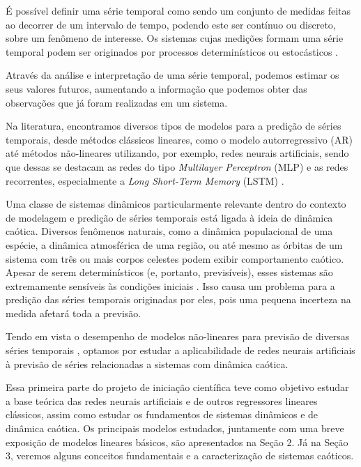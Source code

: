 \documentclass[a4paper, 12pt]{article}
\begin{document}
É possível definir uma série temporal como sendo um conjunto de medidas feitas ao decorrer de um intervalo de tempo, podendo este ser contínuo ou discreto, sobre um fenômeno de interesse. Os sistemas cujas medições formam uma série temporal podem ser originados por processos determinísticos ou estocásticos \cite{box2015time}.

Através da análise e interpretação de uma série temporal, podemos estimar os seus valores futuros, aumentando a informação que podemos obter das observações que já foram realizadas em um sistema.

Na literatura, encontramos diversos tipos de modelos para a  predição de séries temporais, desde métodos clássicos lineares, como o modelo autorregressivo (AR) \cite{box2015time} até métodos não-lineares utilizando, por exemplo, redes neurais artificiais, sendo que dessas se destacam as redes do tipo \textit{Multilayer Perceptron} (MLP) e as redes recorrentes, especialmente a \textit{Long Short-Term Memory} (LSTM)  \cite{connor1994recurrent}.

Uma classe de sistemas dinâmicos particularmente relevante dentro do contexto de modelagem e predição de séries temporais está ligada à ideia de dinâmica caótica. Diversos fenômenos naturais, como a dinâmica populacional de uma espécie, a dinâmica atmosférica de uma região, ou até mesmo as órbitas de um sistema com três ou mais corpos celestes podem exibir comportamento caótico. Apesar de serem determinísticos (e, portanto, previsíveis), esses sistemas são extremamente sensíveis às condições iniciais \cite{fiedler1994caos}. Isso causa um problema para a predição das séries temporais originadas por eles, pois uma pequena incerteza na medida afetará toda a previsão. 

Tendo em vista o desempenho de modelos não-lineares para previsão de diversas séries temporais \cite{connor1994recurrent}, optamos por estudar a aplicabilidade de redes neurais artificiais à previsão de séries relacionadas a sistemas com dinâmica caótica. 

Essa primeira parte do projeto de iniciação científica teve como objetivo estudar a base teórica das redes neurais artificiais e de outros regressores lineares clássicos, assim como estudar os fundamentos de sistemas dinâmicos e de dinâmica caótica. Os principais modelos estudados, juntamente com uma breve exposição de modelos lineares básicos, são apresentados na Seção 2. Já na Seção 3, veremos alguns conceitos fundamentais e a caracterização de sistemas caóticos.
\end{document}
